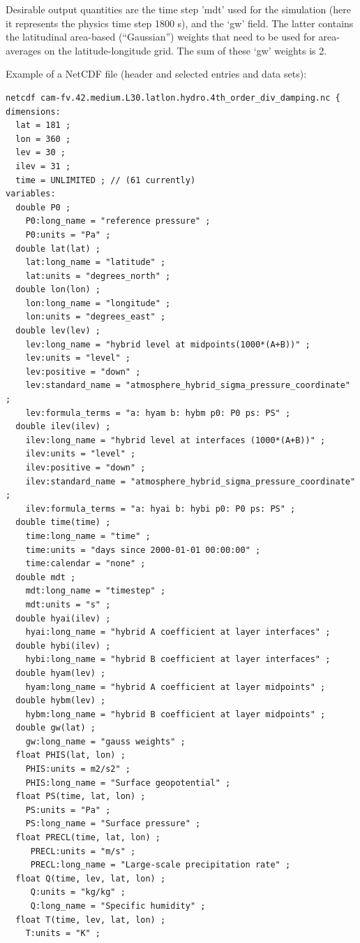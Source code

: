 \documentclass[times,doublespace]{fldauth}
\begin{document}
{\begin{appendix}
Desirable output quantities are the time step 'mdt' used for the simulation (here it represents the physics time step 1800 s), and the `gw' field. The latter contains the latitudinal area-based (``Gaussian'') weights that need to be used for area-averages on the latitude-longitude grid. The sum of these `gw' weights is 2.

 \vspace{0.5cm}
\noindent
Example of a NetCDF file (header and selected entries and data sets):
\begin{verbatim}
netcdf cam-fv.42.medium.L30.latlon.hydro.4th_order_div_damping.nc {
dimensions:
  lat = 181 ;
  lon = 360 ;
  lev = 30 ;
  ilev = 31 ;
  time = UNLIMITED ; // (61 currently)
variables:
  double P0 ;
    P0:long_name = "reference pressure" ;
    P0:units = "Pa" ;
  double lat(lat) ;
    lat:long_name = "latitude" ;
    lat:units = "degrees_north" ;
  double lon(lon) ;
    lon:long_name = "longitude" ;
    lon:units = "degrees_east" ;
  double lev(lev) ;
    lev:long_name = "hybrid level at midpoints(1000*(A+B))" ;
    lev:units = "level" ;
    lev:positive = "down" ;
    lev:standard_name = "atmosphere_hybrid_sigma_pressure_coordinate" ;
    lev:formula_terms = "a: hyam b: hybm p0: P0 ps: PS" ;
  double ilev(ilev) ;
    ilev:long_name = "hybrid level at interfaces (1000*(A+B))" ;
    ilev:units = "level" ;
    ilev:positive = "down" ;
    ilev:standard_name = "atmosphere_hybrid_sigma_pressure_coordinate" ;
    ilev:formula_terms = "a: hyai b: hybi p0: P0 ps: PS" ;
  double time(time) ;
    time:long_name = "time" ;
    time:units = "days since 2000-01-01 00:00:00" ;
    time:calendar = "none" ;
  double mdt ;
    mdt:long_name = "timestep" ;
    mdt:units = "s" ;
  double hyai(ilev) ;
    hyai:long_name = "hybrid A coefficient at layer interfaces" ;
  double hybi(ilev) ;
    hybi:long_name = "hybrid B coefficient at layer interfaces" ;
  double hyam(lev) ;
    hyam:long_name = "hybrid A coefficient at layer midpoints" ;
  double hybm(lev) ;
    hybm:long_name = "hybrid B coefficient at layer midpoints" ;
  double gw(lat) ;
    gw:long_name = "gauss weights" ;
  float PHIS(lat, lon) ;
    PHIS:units = m2/s2" ;
    PHIS:long_name = "Surface geopotential" ;
  float PS(time, lat, lon) ;
    PS:units = "Pa" ;
    PS:long_name = "Surface pressure" ;
  float PRECL(time, lat, lon) ;
     PRECL:units = "m/s" ;
     PRECL:long_name = "Large-scale precipitation rate" ;
  float Q(time, lev, lat, lon) ;
     Q:units = "kg/kg" ;
     Q:long_name = "Specific humidity" ;      
  float T(time, lev, lat, lon) ;
    T:units = "K" ;

\end{verbatim}
\end{appendix}}
\end{document}
